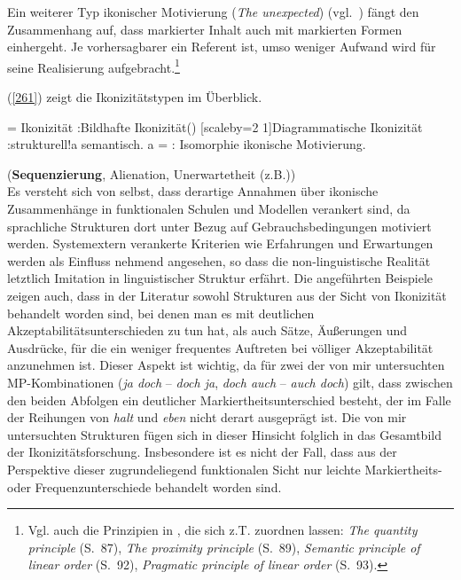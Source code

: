 Ein weiterer Typ ikonischer Motivierung  (\textit{The unexpected}) (vgl.\ \citealt[194]{Haiman1992}) fängt den Zusammenhang auf, dass markierter Inhalt auch mit markierten Formen  einhergeht. Je vorhersagbarer ein Referent ist, umso weniger Aufwand wird für seine Realisierung aufgebracht.\footnote{Vgl. auch die Prinzipien in \citet{Givon1991}, die sich z.T. zuordnen lassen: \textit{The quantity principle} (S.~87), \textit{The proximity principle} (S.~89), \textit{Semantic principle of linear order} (S.~92), \textit{Pragmatic principle of linear order} (S.~93).}

(\ref{261}) zeigt die Ikonizitätstypen im Überblick.

\begin{exe}
\ex\label{261}
\begin{jtree}[xunit=2, yunit=1]
\! = {Ikonizität}
      :{Bildhafte Ikonizität}() [scaleby=2 1]{Diagrammatische Ikonizität}
      :{strukturell}!a {semantisch}.
\!a = : {Isomorphie} {ikonische Motivierung}.
\end{jtree}
\end{exe}
\vskip-10pt
\hfill{(\textbf{Sequenzierung}, Alienation, Unerwartetheit (z.B.))}\\

\noindent
Es versteht sich von selbst, dass derartige Annahmen über ikonische Zusammenhänge in funktionalen Schulen und Modellen verankert sind, da sprachliche Strukturen dort unter Bezug auf Gebrauchsbedingungen motiviert werden. Systemextern verankerte Kriterien wie Erfahrungen und Erwartungen werden als Einfluss nehmend angesehen, so dass die non-linguistische Realität letztlich I\-mitation in linguistischer Struktur erfährt. Die angeführten Beispiele zeigen auch, dass in der Literatur sowohl Strukturen aus der Sicht von Ikonizität behandelt worden sind, bei denen man es mit deutlichen Akzeptabilitätsunterschieden zu tun hat, als auch Sätze, Äußerungen und Ausdrücke, für die  ein weniger frequentes Auftreten bei völliger Akzeptabilität anzunehmen ist. Dieser Aspekt ist wichtig, da für zwei der von mir untersuchten MP-Kom\-bi\-na\-ti\-on\-en (\textit{ja doch} – \textit{doch ja}, \textit{doch auch} – \textit{auch doch}) gilt, dass zwischen den beiden Abfolgen ein deutlicher Markiertheitsunterschied  besteht, der im Falle der Reihungen von \textit{halt} und \textit{eben} nicht derart ausgeprägt ist. Die von mir untersuchten Strukturen fügen sich in dieser Hinsicht folglich in das Gesamtbild der Ikonizitätsforschung. Insbesondere ist es nicht der Fall, dass aus der Perspektive dieser zugrundeliegend funktionalen Sicht nur leichte Markiertheits- oder Frequenzunterschiede behandelt worden sind.

